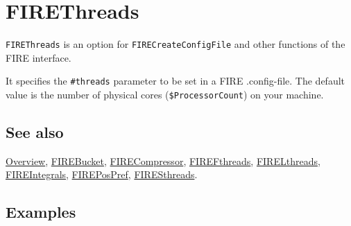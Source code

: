 \documentclass[../FeynHelpersManual.tex]{subfiles}
\begin{document}
\hypertarget{firethreads}{
\section{FIREThreads}\label{firethreads}}

\texttt{FIREThreads} is an option for \texttt{FIRECreateConfigFile} and
other functions of the FIRE interface.

It specifies the \texttt{\#{}\allowbreak{}threads} parameter to be set
in a FIRE .config-file. The default value is the number of physical
cores (\texttt{\$ProcessorCount}) on your machine.

\subsection{See also}

\hyperlink{toc}{Overview}, \hyperlink{firebucket}{FIREBucket},
\hyperlink{firecompressor}{FIRECompressor},
\hyperlink{firefthreads}{FIREFthreads},
\hyperlink{firelthreads}{FIRELthreads},
\hyperlink{fireintegrals}{FIREIntegrals},
\hyperlink{firepospref}{FIREPosPref},
\hyperlink{firesthreads}{FIRESthreads}.

\subsection{Examples}
\end{document}
